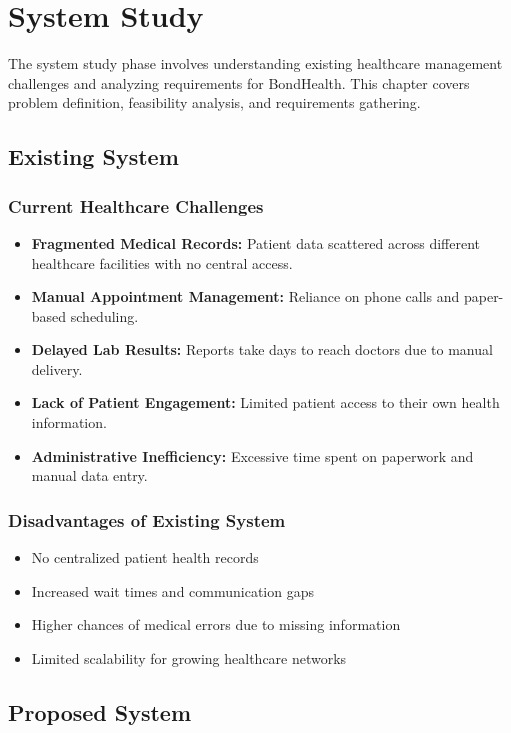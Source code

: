 \chapter{System Study}

The system study phase involves understanding existing healthcare management challenges and analyzing requirements for BondHealth. This chapter covers problem definition, feasibility analysis, and requirements gathering.

\section{Existing System}

\subsection{Current Healthcare Challenges}
\begin{itemize}
    \item \textbf{Fragmented Medical Records:} Patient data scattered across different healthcare facilities with no central access.
    \item \textbf{Manual Appointment Management:} Reliance on phone calls and paper-based scheduling.
    \item \textbf{Delayed Lab Results:} Reports take days to reach doctors due to manual delivery.
    \item \textbf{Lack of Patient Engagement:} Limited patient access to their own health information.
    \item \textbf{Administrative Inefficiency:} Excessive time spent on paperwork and manual data entry.
\end{itemize}

\subsection{Disadvantages of Existing System}
\begin{itemize}
    \item No centralized patient health records
    \item Increased wait times and communication gaps
    \item Higher chances of medical errors due to missing information
    \item Limited scalability for growing healthcare networks
\end{itemize}

\section{Proposed System}


